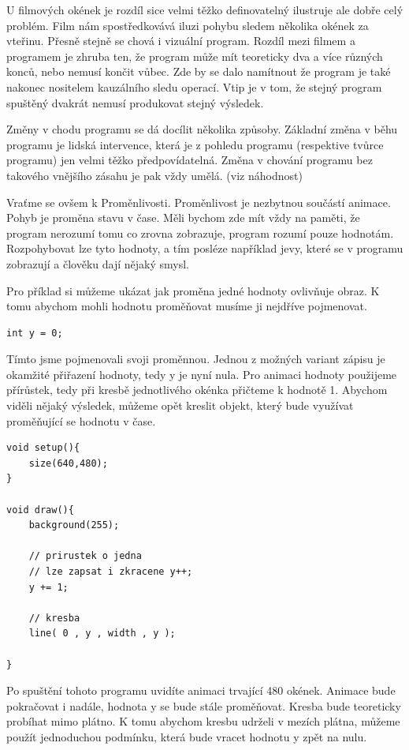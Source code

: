 \documentclass[11pt]{book}
\begin{document}
U filmových okének je rozdíl sice velmi těžko definovatelný ilustruje ale dobře celý problém. Film nám spostředkovává iluzi pohybu sledem několika okének za vteřinu. Přesně stejně se chová i vizuální program. Rozdíl mezi filmem a programem je zhruba ten, že program může mít teoreticky dva a více různých konců, nebo nemusí končit vůbec. Zde by se dalo namítnout že program je také nakonec nositelem kauzálního sledu operací. Vtip je v tom, že stejný program spuštěný dvakrát nemusí produkovat stejný výsledek.

Změny v chodu programu se dá docílit několika způsoby. Základní změna v běhu programu je lidská intervence, která je z pohledu programu (respektive tvůrce programu) jen velmi těžko předpovídatelná. Změna v chování programu bez takového vnějšího zásahu je pak vždy umělá. (viz náhodnost)


Vraťme se ovšem k Proměnlivosti. Proměnlivost je nezbytnou součástí animace. Pohyb je proměna stavu v čase. Měli bychom zde mít vždy na paměti, že program nerozumí tomu co zrovna zobrazuje, program rozumí pouze hodnotám. Rozpohybovat lze tyto hodnoty, a tím posléze například jevy, které se v programu zobrazují a člověku dají nějaký smysl. 

Pro příklad si můžeme ukázat jak proměna jedné hodnoty ovlivňuje obraz. K tomu abychom mohli hodnotu proměňovat musíme ji nejdříve pojmenovat.

\begin{lstlisting}
int y = 0;
\end{lstlisting}

Tímto jsme pojmenovali svoji proměnnou. Jednou z možných variant zápisu je okamžité přiřazení hodnoty, tedy y je nyní nula. Pro animaci hodnoty použijeme přírůstek, tedy při kresbě jednotlivého okénka přičteme k hodnotě 1. Abychom viděli nějaký výsledek, můžeme opět kreslit objekt, který bude využívat proměňující se hodnotu v čase.

\begin{lstlisting}
void setup(){
	size(640,480);
}

void draw(){
	background(255);
	
	// prirustek o jedna
	// lze zapsat i zkracene y++;
	y += 1;
	
	// kresba
	line( 0 , y , width , y );

}
\end{lstlisting}

Po spuštění tohoto programu uvidíte animaci trvající 480 okének. Animace bude pokračovat i nadále, hodnota y se bude stále proměňovat. Kresba bude teoreticky probíhat mimo plátno. K tomu abychom kresbu udrželi v mezích plátna, můžeme použít jednoduchou podmínku, která bude vracet hodnotu y zpět na nulu.
\end{document}

